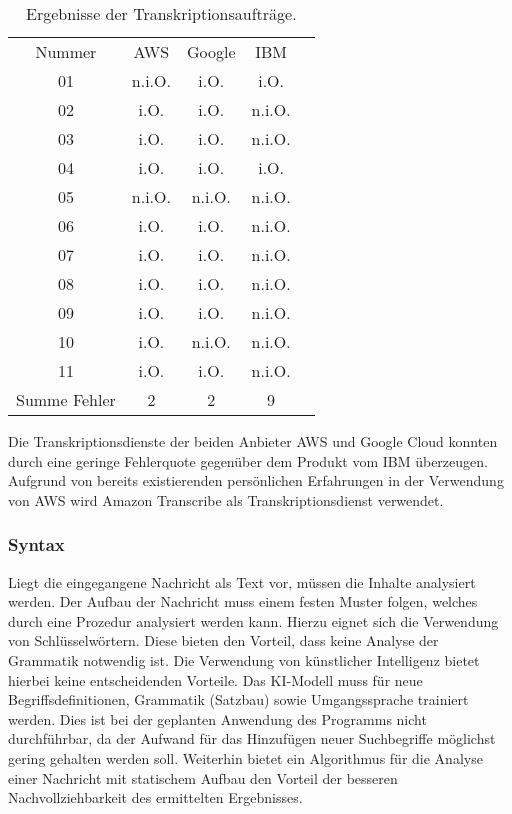 \begin{table}[hb!]
\centering
\begin{tabular}{ccccc}
Nummer 		& AWS	& Google		& IBM \\
01			& n.i.O.	& i.O.		& i.O. \\
02			& i.O.	& i.O.		& n.i.O. \\
03			& i.O.	& i.O.		& n.i.O. \\
04			& i.O.	& i.O.		& i.O. \\
05			& n.i.O.	& n.i.O.		& n.i.O. \\
06			& i.O.	& i.O.		& n.i.O. \\
07			& i.O.	& i.O.		& n.i.O. \\
08			& i.O.	& i.O.		& n.i.O. \\
09			& i.O.	& i.O.		& n.i.O. \\
10			& i.O.	& n.i.O.		& n.i.O. \\
11			& i.O.	& i.O.		& n.i.O. \\
\hline
Summe Fehler	& 2		& 2			& 9
\end{tabular}
\caption{Ergebnisse der Transkriptionsaufträge.}
\label{tab:erg-transkript}
\end{table}

\FloatBarrier

Die Transkriptionsdienste der beiden Anbieter AWS und Google Cloud konnten durch eine geringe Fehlerquote gegenüber dem Produkt vom IBM überzeugen. Aufgrund von bereits existierenden persönlichen Erfahrungen in der Verwendung von AWS wird Amazon Transcribe als Transkriptionsdienst verwendet.

\subsubsection{Syntax}
\label{sec:syntax}

Liegt die eingegangene Nachricht als Text vor, müssen die Inhalte analysiert werden. Der Aufbau der Nachricht muss einem festen Muster folgen, welches durch eine Prozedur analysiert werden kann. Hierzu eignet sich die Verwendung von Schlüsselwörtern. Diese bieten den Vorteil, dass keine Analyse der Grammatik notwendig ist. Die Verwendung von künstlicher Intelligenz bietet hierbei keine entscheidenden Vorteile. Das KI-Modell muss für neue Begriffsdefinitionen, Grammatik (Satzbau) sowie Umgangssprache trainiert werden. Dies ist bei der geplanten Anwendung des Programms nicht durchführbar, da der Aufwand für das Hinzufügen neuer Suchbegriffe möglichst gering gehalten werden soll. Weiterhin bietet ein Algorithmus für die Analyse einer Nachricht mit statischem Aufbau den Vorteil der besseren Nachvollziehbarkeit des ermittelten Ergebnisses.


